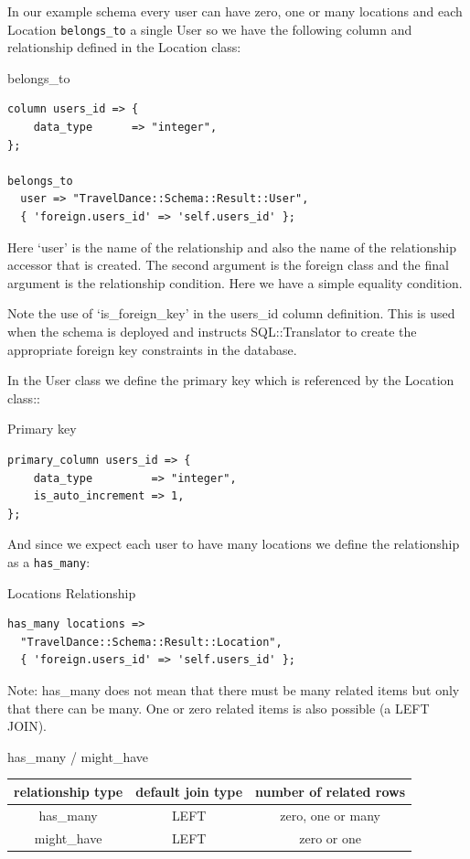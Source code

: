 In our example schema every user can have zero, one or many locations and
each Location \verb|belongs_to| a single User so we have the following column and
relationship defined in the Location class: 
 
\begin{frame}[fragile]{belongs\_to}
\begin{lstlisting}
column users_id => {
    data_type      => "integer",
};

belongs_to
  user => "TravelDance::Schema::Result::User",
  { 'foreign.users_id' => 'self.users_id' };
\end{lstlisting}
\end{frame}

Here ‘user’ is the name of the relationship and also the name of the relationship accessor that is created. The second argument is the foreign class and the final argument is the relationship condition. Here we have a simple equality condition.

Note the use of ‘is\_foreign\_key’ in the users\_id column definition. This is used when the schema is deployed and instructs SQL::Translator to create the appropriate foreign key constraints in the database.

In the User class we define the primary key which is referenced by the Location class::

\begin{frame}[fragile]{Primary key}
\begin{lstlisting}
primary_column users_id => {
    data_type         => "integer",
    is_auto_increment => 1,
};
\end{lstlisting}
\end{frame}

And since we expect each user to have many locations we define the relationship as a \verb|has_many|:

\begin{frame}[fragile]{Locations Relationship}
\begin{lstlisting}
has_many locations =>
  "TravelDance::Schema::Result::Location",
  { 'foreign.users_id' => 'self.users_id' };
\end{lstlisting}
\end{frame}

Note: has\_many does not mean that there must be many related items but only that there can be many. One or zero related items is also possible (a LEFT JOIN).


\begin{frame}{has\_many / might\_have}
\begin{table}
\begin{tabular}{c | c | c}
relationship type & default join type & number of related rows \\
\hline
has\_many & LEFT & zero, one or many \\
might\_have & LEFT & zero or one \\
\end{tabular}
\end{table}
\end{frame}

